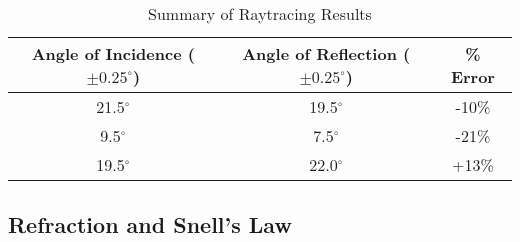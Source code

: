 \documentclass[twocolumn,english]{IEEEtran}
\theoremstyle{plain}
\theoremstyle{plain}
\begin{document}
\begin{table}[!H]
\centering{}
\caption{Summary of Raytracing Results}
\label{tb:raytracing}
\begin{tabular}{@{}ccc@{}}
\toprule
\textbf{Angle of Incidence ($\pm 0.25^{\circ}$)} & \textbf{Angle of  Reflection ($\pm 0.25^{\circ}$)} & \textbf{\% Error}	\\ \midrule
	21.5$^{\circ}$          &	19.5$^{\circ}$              & -10\%       		\\ \midrule
	9.5$^{\circ}$			&	7.5$^{\circ}$				& -21\%            	\\ \midrule
    19.5$^{\circ}$          &	22.0$^{\circ}$              & +13\%             \\ \bottomrule
\end{tabular}
\end{table}

\subsection{\textbf{Refraction and Snell's Law}}
\end{document}
